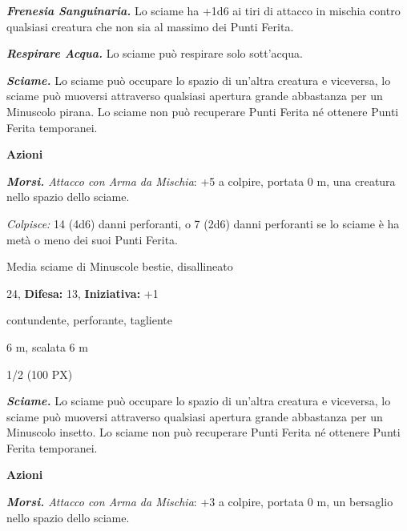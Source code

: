 \begin{multicols}{2}
{\emph{\textbf{Frenesia Sanguinaria.}} Lo sciame ha +1d6 ai tiri di attacco in mischia contro qualsiasi creatura che non sia al massimo dei Punti Ferita.

\emph{\textbf{Respirare Acqua.}} Lo sciame può respirare solo sott'acqua.

\emph{\textbf{Sciame.}} Lo sciame può occupare lo spazio di un'altra creatura e viceversa, lo sciame può muoversi attraverso qualsiasi apertura grande abbastanza per un Minuscolo pirana. Lo sciame non può recuperare Punti Ferita né ottenere Punti Ferita temporanei.

\textbf{Azioni}

\emph{\textbf{Morsi.} Attacco con Arma da Mischia}: +5 a colpire, portata 0 m, una creatura nello spazio dello sciame.

\emph{Colpisce:} 14 (4d6) danni perforanti, o 7 (2d6) danni perforanti se lo sciame è ha metà o meno dei suoi Punti Ferita.

\begin{description}[noitemsep, topsep=0pt, parsep=0pt, partopsep=0pt, leftmargin=0cm, labelwidth=2.2cm]
    \item[\textbf{Taglia/Tipo:}] Media sciame di Minuscole bestie, disallineato
    \item[\textbf{Caratt.:}] 
    \item[\textbf{Punti Ferita:}] 24,  \textbf{Difesa:} 13,  \textbf{Iniziativa:} +1
    \item[\textbf{Resistenze al danno:}] contundente, perforante, tagliente
    \item[\textbf{Tiri Salvez.:}] 
    \item[\textbf{Movimento:}] 6 m, scalata 6 m
    \item[\textbf{Sfida:}] 1/2 (100 PX)\smallskip
\end{description}

\emph{\textbf{Sciame.}} Lo sciame può occupare lo spazio di un'altra creatura e viceversa, lo sciame può muoversi attraverso qualsiasi apertura grande abbastanza per un Minuscolo insetto. Lo sciame non può recuperare Punti Ferita né ottenere Punti Ferita temporanei.

\textbf{Azioni}

\emph{\textbf{Morsi.} Attacco con Arma da Mischia}: +3 a colpire, portata 0 m, un bersaglio nello spazio dello sciame.

}
\end{multicols}
